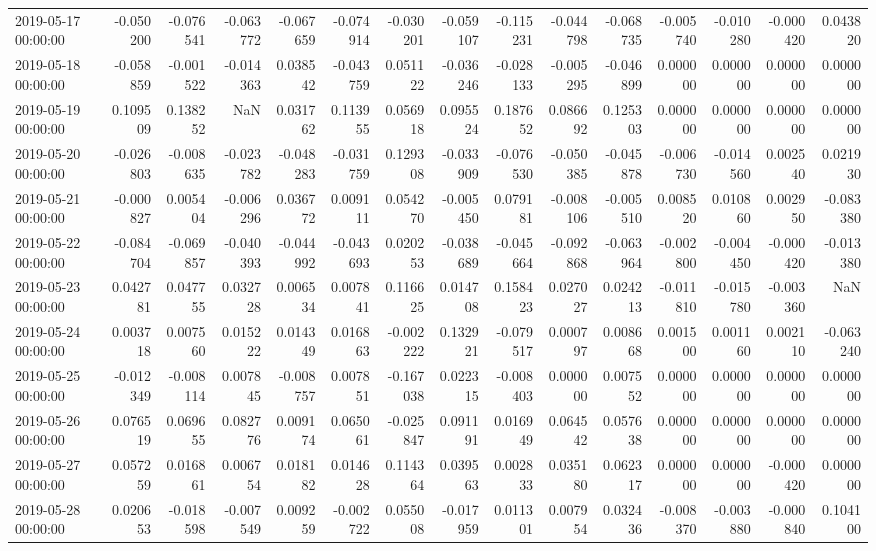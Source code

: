\begin{tabular}{lrrrrrrrrrrrrrr}
2019-05-17 00:00:00 & -0.050200 & -0.076541 & -0.063772 & -0.067659 & -0.074914 & -0.030201 & -0.059107 & -0.115231 & -0.044798 & -0.068735 & -0.005740 & -0.010280 & -0.000420 & 0.043820 \\
2019-05-18 00:00:00 & -0.058859 & -0.001522 & -0.014363 & 0.038542 & -0.043759 & 0.051122 & -0.036246 & -0.028133 & -0.005295 & -0.046899 & 0.000000 & 0.000000 & 0.000000 & 0.000000 \\
2019-05-19 00:00:00 & 0.109509 & 0.138252 & NaN & 0.031762 & 0.113955 & 0.056918 & 0.095524 & 0.187652 & 0.086692 & 0.125303 & 0.000000 & 0.000000 & 0.000000 & 0.000000 \\
2019-05-20 00:00:00 & -0.026803 & -0.008635 & -0.023782 & -0.048283 & -0.031759 & 0.129308 & -0.033909 & -0.076530 & -0.050385 & -0.045878 & -0.006730 & -0.014560 & 0.002540 & 0.021930 \\
2019-05-21 00:00:00 & -0.000827 & 0.005404 & -0.006296 & 0.036772 & 0.009111 & 0.054270 & -0.005450 & 0.079181 & -0.008106 & -0.005510 & 0.008520 & 0.010860 & 0.002950 & -0.083380 \\
2019-05-22 00:00:00 & -0.084704 & -0.069857 & -0.040393 & -0.044992 & -0.043693 & 0.020253 & -0.038689 & -0.045664 & -0.092868 & -0.063964 & -0.002800 & -0.004450 & -0.000420 & -0.013380 \\
2019-05-23 00:00:00 & 0.042781 & 0.047755 & 0.032728 & 0.006534 & 0.007841 & 0.116625 & 0.014708 & 0.158423 & 0.027027 & 0.024213 & -0.011810 & -0.015780 & -0.003360 & NaN \\
2019-05-24 00:00:00 & 0.003718 & 0.007560 & 0.015222 & 0.014349 & 0.016863 & -0.002222 & 0.132921 & -0.079517 & 0.000797 & 0.008668 & 0.001500 & 0.001160 & 0.002110 & -0.063240 \\
2019-05-25 00:00:00 & -0.012349 & -0.008114 & 0.007845 & -0.008757 & 0.007851 & -0.167038 & 0.022315 & -0.008403 & 0.000000 & 0.007552 & 0.000000 & 0.000000 & 0.000000 & 0.000000 \\
2019-05-26 00:00:00 & 0.076519 & 0.069655 & 0.082776 & 0.009174 & 0.065061 & -0.025847 & 0.091191 & 0.016949 & 0.064542 & 0.057638 & 0.000000 & 0.000000 & 0.000000 & 0.000000 \\
2019-05-27 00:00:00 & 0.057259 & 0.016861 & 0.006754 & 0.018182 & 0.014628 & 0.114364 & 0.039563 & 0.002833 & 0.035180 & 0.062317 & 0.000000 & 0.000000 & -0.000420 & 0.000000 \\
2019-05-28 00:00:00 & 0.020653 & -0.018598 & -0.007549 & 0.009259 & -0.002722 & 0.055008 & -0.017959 & 0.011301 & 0.007954 & 0.032436 & -0.008370 & -0.003880 & -0.000840 & 0.104100 \\

\end{tabular}
